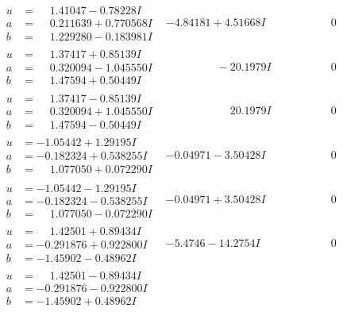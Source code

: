 \documentclass[1p]{elsarticle_modified}
\theoremstyle{definition}
\begin{document}
$$\begin{array}{c|c|c}
\begin{aligned}
u &= \phantom{-}1.41047 - 0.78228 I \\
a &= \phantom{-}0.211639 + 0.770568 I \\
b &= \phantom{-}1.229280 - 0.183981 I\end{aligned}
 & -4.84181 + 4.51668 I & \phantom{-0.000000 } 0 \\ \hline\begin{aligned}
u &= \phantom{-}1.37417 + 0.85139 I \\
a &= \phantom{-}0.320094 - 1.045550 I \\
b &= \phantom{-}1.47594 + 0.50449 I\end{aligned}
 & \phantom{-0.000000 } -20.1979 I & \phantom{-0.000000 } 0 \\ \hline\begin{aligned}
u &= \phantom{-}1.37417 - 0.85139 I \\
a &= \phantom{-}0.320094 + 1.045550 I \\
b &= \phantom{-}1.47594 - 0.50449 I\end{aligned}
 & \phantom{-0.000000 -}20.1979 I & \phantom{-0.000000 } 0 \\ \hline\begin{aligned}
u &= -1.05442 + 1.29195 I \\
a &= -0.182324 + 0.538255 I \\
b &= \phantom{-}1.077050 + 0.072290 I\end{aligned}
 & -0.04971 - 3.50428 I & \phantom{-0.000000 } 0 \\ \hline\begin{aligned}
u &= -1.05442 - 1.29195 I \\
a &= -0.182324 - 0.538255 I \\
b &= \phantom{-}1.077050 - 0.072290 I\end{aligned}
 & -0.04971 + 3.50428 I & \phantom{-0.000000 } 0 \\ \hline\begin{aligned}
u &= \phantom{-}1.42501 + 0.89434 I \\
a &= -0.291876 + 0.922800 I \\
b &= -1.45902 - 0.48962 I\end{aligned}
 & -5.4746 - 14.2754 I & \phantom{-0.000000 } 0 \\ \hline\begin{aligned}
u &= \phantom{-}1.42501 - 0.89434 I \\
a &= -0.291876 - 0.922800 I \\
b &= -1.45902 + 0.48962 I\end{aligned}

\end{array}$$
\end{document}
